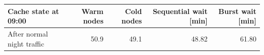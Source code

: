 \begin{tabular}{lrrrr}
\toprule
Cache state at 09:00 & Warm nodes & Cold nodes & Sequential wait [min] & Burst wait [min] \\
\midrule
After normal night traffic & 50.9 & 49.1 & 48.82 & 61.80 \\
\bottomrule
\end{tabular}
